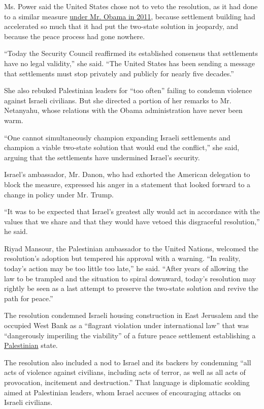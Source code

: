 Ms. Power said the United States chose not to veto the resolution, as it
had done to a similar measure
\href{http://www.nytimes3xbfgragh.onion/2011/02/19/world/middleeast/19nations.html}{under
Mr. Obama in 2011}, because settlement building had accelerated so much
that it had put the two-state solution in jeopardy, and because the
peace process had gone nowhere.

``Today the Security Council reaffirmed its established consensus that
settlements have no legal validity,'' she said. ``The United States has
been sending a message that settlements must stop privately and publicly
for nearly five decades.''

She also rebuked Palestinian leaders for ``too often'' failing to
condemn violence against Israeli civilians. But she directed a portion
of her remarks to Mr. Netanyahu, whose relations with the Obama
administration have never been warm.

``One cannot simultaneously champion expanding Israeli settlements and
champion a viable two-state solution that would end the conflict,'' she
said, arguing that the settlements have undermined Israel's security.

Israel's ambassador, Mr. Danon, who had exhorted the American delegation
to block the measure, expressed his anger in a statement that looked
forward to a change in policy under Mr. Trump.

``It was to be expected that Israel's greatest ally would act in
accordance with the values that we share and that they would have vetoed
this disgraceful resolution,'' he said.

Riyad Mansour, the Palestinian ambassador to the United Nations,
welcomed the resolution's adoption but tempered his approval with a
warning. ``In reality, today's action may be too little too late,'' he
said. ``After years of allowing the law to be trampled and the situation
to spiral downward, today's resolution may rightly be seen as a last
attempt to preserve the two-state solution and revive the path for
peace.''

The resolution condemned Israeli housing construction in East Jerusalem
and the occupied West Bank as a ``flagrant violation under international
law'' that was ``dangerously imperiling the viability'' of a future
peace settlement establishing a
\href{http://topics.nytimes3xbfgragh.onion/top/reference/timestopics/subjects/p/palestinians/index.html?inline=nyt-classifier}{Palestinian}
state.

The resolution also included a nod to Israel and its backers by
condemning ``all acts of violence against civilians, including acts of
terror, as well as all acts of provocation, incitement and
destruction.'' That language is diplomatic scolding aimed at Palestinian
leaders, whom Israel accuses of encouraging attacks on Israeli
civilians.

